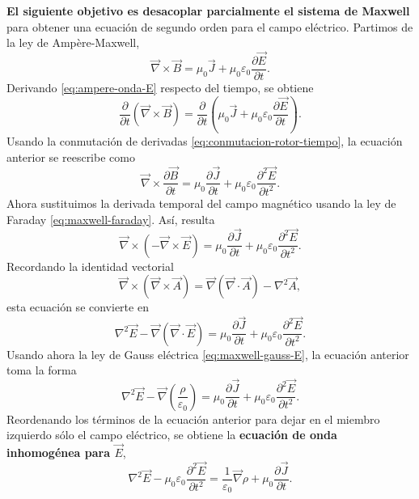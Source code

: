 \documentclass[12pt,a4paper]{article}
\theoremstyle{definition}
\theoremstyle{plain}
\numberwithin{equation}{section}
\theoremstyle{remark}
\newcommand{\E}{\vec{E}}
\newcommand{\B}{\vec{B}}
\newcommand{\J}{\vec{J}}
\begin{document}
\textbf{El siguiente objetivo es desacoplar parcialmente el sistema de Maxwell} para obtener una ecuación de segundo orden para el campo eléctrico. Partimos de la ley de Ampère-Maxwell,
\begin{equation}
    \vec \nabla \times \B = \mu_0\J+\mu_0\varepsilon_0\frac{\partial\E}{\partial t}.
    \label{eq:ampere-onda-E}
\end{equation}
Derivando \eqref{eq:ampere-onda-E} respecto del tiempo, se obtiene
\begin{equation*}
    \frac{\partial}{\partial t}\left(\vec \nabla \times \B\right)=\frac{\partial}{\partial t}\left(\mu_0\J+\mu_0\varepsilon_0\frac{\partial\E}{\partial t}\right).
\end{equation*}
Usando la conmutación de derivadas \eqref{eq:conmutacion-rotor-tiempo}, la ecuación anterior se reescribe como
\begin{equation*}
   \vec \nabla \times \frac{\partial\B}{\partial t}=\mu_0\frac{\partial\J}{\partial t}+\mu_0\varepsilon_0\frac{\partial^2\E}{\partial t^2}.
\end{equation*}
Ahora sustituimos la derivada temporal del campo magnético usando la ley de Faraday \eqref{eq:maxwell-faraday}. Así, resulta
\begin{equation*}
   \vec \nabla \times \left(-\vec\nabla\times \E\right)=\mu_0\frac{\partial\J}{\partial t}+\mu_0\varepsilon_0\frac{\partial^2\E}{\partial t^2}.
\end{equation*}
Recordando la identidad vectorial
\begin{equation}
    \vec \nabla \times (\vec \nabla \times \vec A)=\vec\nabla(\vec\nabla\cdot \vec A)-\nabla^2\vec A,
    \label{eq:identidad-rotrot}
\end{equation}
esta ecuación se convierte en
\begin{equation*}
  \nabla^2\vec E- \vec\nabla(\vec\nabla\cdot \E)= \mu_0\frac{\partial\J}{\partial t}+\mu_0\varepsilon_0\frac{\partial^2\E}{\partial t^2}.
\end{equation*}
Usando ahora la ley de Gauss eléctrica \eqref{eq:maxwell-gauss-E}, la ecuación anterior toma la forma
\begin{equation*}
  \nabla^2\vec E- \vec\nabla\left(\frac{\rho}{\varepsilon_0}\right)= \mu_0\frac{\partial\J}{\partial t}+\mu_0\varepsilon_0\frac{\partial^2\E}{\partial t^2}.
\end{equation*}
Reordenando los términos de la ecuación anterior para dejar en el miembro izquierdo sólo el campo eléctrico, se obtiene la \textbf{ecuación de onda inhomogénea para $\E$},
\begin{equation}
  \nabla^2\vec E- \mu_0\varepsilon_0\frac{\partial^2\E}{\partial t^2}=\frac{1}{\varepsilon_0}\vec\nabla \rho+\mu_0\frac{\partial\J}{\partial t}.
  \label{eq:ecuacion-onda-E}
\end{equation}
\end{document}
